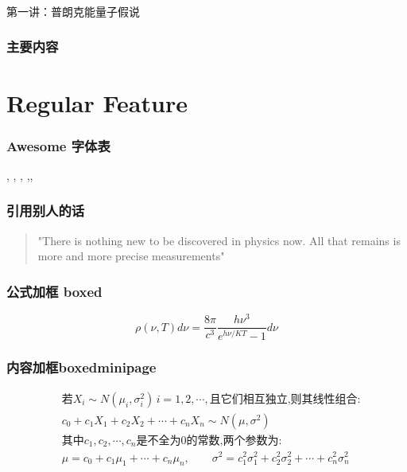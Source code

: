 \begin{frame} [plain]
  \frametitle{}
  \Background[1] 
  \begin{center}
  { {\huge 第一讲：普朗克能量子假说 }}
  \end{center}  
  \addtocounter{framenumber}{-1}   
\end{frame}

\begin{frame}
      \frametitle{主要内容}
      \transfade
      \tableofcontents
      \addtocounter{framenumber}{-1} 
\end{frame}

\section{Regular Feature}

\begin{frame}
  \frametitle{Awesome 字体表}
  \alert{\faHeartbeat, \faStar, \faThumbTack, \faThumbsUp,\faUniversity, \faCircle} 

\end{frame}



\begin{frame}
  \frametitle{引用别人的话}
  \begin{quotation}
    "There is nothing new to be discovered in physics now. All that remains is 
    more and more precise measurements"   \\
\end{quotation}  
\end{frame}

\begin{frame}
  \frametitle{公式加框 boxed}
  \begin{equation}
    \boxed{\rho(\nu, T) d \nu=\frac{8 \pi}{c^{3}} \frac{h \nu^{3}}{e^{h \nu / K T}-1} d \nu}
  \end{equation}
 
\end{frame}

\begin{frame}
  \frametitle{内容加框boxedminipage}
  \begin{boxedminipage}{0.9\linewidth}
    \[\begin{aligned}
    & \text{若}X_i\sim N(\mu_i,\sigma_i^2)\, i=1,2,\cdots,\text{且它们相互独立,则其线性组合:}\\
    & c_0+c_1X_1+c_2X_2+\cdots+c_nX_n\sim N(\mu,\sigma^2)\\
    & \text{其中}c_1,c_2,\cdots,c_n \text{是不全为0的常数,两个参数为:}\\
    & \mu=c_0+c_1\mu_1+\cdots+c_n\mu_n,\qquad \sigma^2=c_1^2\sigma_1^2+c_2^2\sigma_2^2+\cdots+c_n^2\sigma_n^2
    \end{aligned}\]
    \vspace{2pt}
    \end{boxedminipage}
\end{frame}


